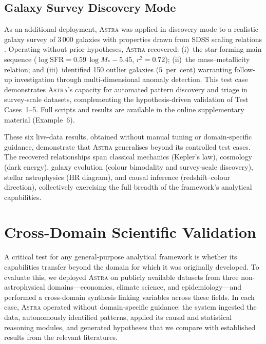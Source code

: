\documentclass[usenatbib]{rasti}
\newcommand{\astra}{\textsc{Astra}\xspace}
\begin{document}
\subsection{Galaxy Survey Discovery Mode}
\label{sec:live:galaxy}

As an additional deployment, \astra was applied in discovery mode to a realistic galaxy survey of 3\,000 galaxies with properties drawn from SDSS scaling relations \citep{Elbaz2007,Mannucci2010}.
Operating without prior hypotheses, \astra recovered: (i)~the star-forming main sequence ($\log \mathrm{SFR} = 0.59\,\log M_* - 5.45$, $r^2 = 0.72$); (ii)~the mass--metallicity relation; and (iii)~identified 150 outlier galaxies ($5$~per~cent) warranting follow-up investigation through multi-dimensional anomaly detection.
This test case demonstrates \astra's capacity for automated pattern discovery and triage in survey-scale datasets, complementing the hypothesis-driven validation of Test Cases~1--5.
Full scripts and results are available in the online supplementary material (Example~6).

\medskip

These six live-data results, obtained without manual tuning or domain-specific guidance, demonstrate that \astra generalises beyond its controlled test cases.
The recovered relationships span classical mechanics (Kepler's law), cosmology (dark energy), galaxy evolution (colour bimodality and survey-scale discovery), stellar astrophysics (HR diagram), and causal inference (redshift--colour direction), collectively exercising the full breadth of the framework's analytical capabilities.

\section{Cross-Domain Scientific Validation}
\label{sec:crossdomain}

A critical test for any general-purpose analytical framework is whether its capabilities transfer beyond the domain for which it was originally developed.
To evaluate this, we deployed \astra on publicly available datasets from three non-astrophysical domains---economics, climate science, and epidemiology---and performed a cross-domain synthesis linking variables across these fields.
In each case, \astra operated without domain-specific guidance: the system ingested the data, autonomously identified patterns, applied its causal and statistical reasoning modules, and generated hypotheses that we compare with established results from the relevant literatures.
\end{document}

